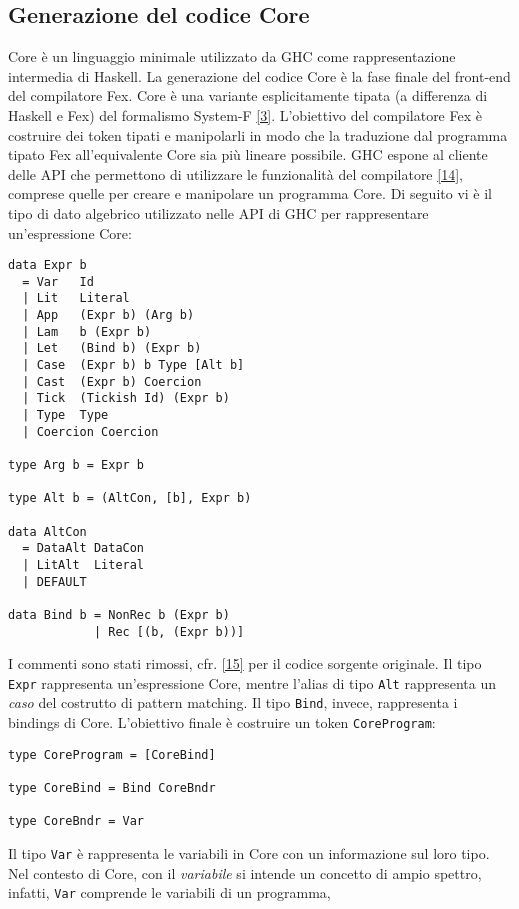 \documentclass[10pt,a4paper]{article}
\begin{document}
\hypertarget{Generazione del codice Core}{\subsection{Generazione del codice Core}}
Core è un linguaggio minimale utilizzato da GHC come rappresentazione intermedia di Haskell. La generazione
del codice Core è la fase finale del front-end del compilatore Fex. Core è una variante
esplicitamente tipata (a differenza di Haskell e Fex) del formalismo System-F \hyperlink{bibl3}{[3]}. L'obiettivo del
compilatore
Fex è costruire dei token tipati e manipolarli in modo che la traduzione dal programma tipato Fex all'equivalente
Core sia più lineare possibile. GHC espone al cliente delle API che permettono di utilizzare le funzionalità del
compilatore \hyperlink{bibl14}{[14]}, comprese quelle per creare e manipolare un programma Core. Di seguito vi è il tipo
di dato algebrico utilizzato nelle API di GHC per rappresentare un'espressione Core:
\begin{lstlisting}
data Expr b
  = Var   Id
  | Lit   Literal
  | App   (Expr b) (Arg b)
  | Lam   b (Expr b)
  | Let   (Bind b) (Expr b)
  | Case  (Expr b) b Type [Alt b]
  | Cast  (Expr b) Coercion
  | Tick  (Tickish Id) (Expr b)
  | Type  Type
  | Coercion Coercion

type Arg b = Expr b

type Alt b = (AltCon, [b], Expr b)

data AltCon
  = DataAlt DataCon
  | LitAlt  Literal
  | DEFAULT

data Bind b = NonRec b (Expr b)
            | Rec [(b, (Expr b))]
\end{lstlisting}
I commenti sono stati rimossi, cfr. \hyperlink{bibl15}{[15]} per il codice sorgente originale. Il tipo \texttt{Expr}
rappresenta
un'espressione Core, mentre l'alias di tipo \texttt{Alt} rappresenta un \textit{caso} del costrutto di pattern matching.
Il tipo \texttt{Bind}, invece, rappresenta i bindings di Core.
L'obiettivo finale è costruire un token \texttt{CoreProgram}:
\begin{lstlisting}
type CoreProgram = [CoreBind]

type CoreBind = Bind CoreBndr

type CoreBndr = Var
\end{lstlisting}
Il tipo \texttt{Var} è rappresenta le variabili in Core con un informazione sul loro tipo. Nel contesto di Core, con il
\textit{variabile} si intende un concetto di ampio spettro, infatti, \texttt{Var} comprende le variabili di un programma,
\end{document}

